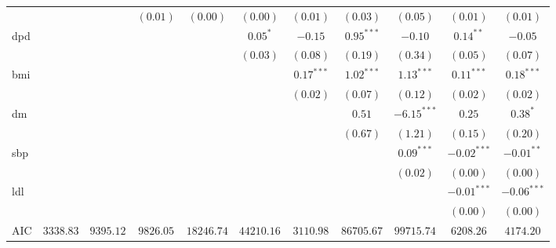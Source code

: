 \begin{tabular}{l c c c c c c c c c c}
                 &               &               & $(0.01)$      & $(0.00)$      & $(0.00)$      & $(0.01)$       & $(0.03)$      & $(0.05)$       & $(0.01)$       & $(0.01)$      \\
dpd              &               &               &               &               & $0.05^{*}$    & $-0.15$        & $0.95^{***}$  & $-0.10$        & $0.14^{**}$    & $-0.05$       \\
                 &               &               &               &               & $(0.03)$      & $(0.08)$       & $(0.19)$      & $(0.34)$       & $(0.05)$       & $(0.07)$      \\
bmi              &               &               &               &               &               & $0.17^{***}$   & $1.02^{***}$  & $1.13^{***}$   & $0.11^{***}$   & $0.18^{***}$  \\
                 &               &               &               &               &               & $(0.02)$       & $(0.07)$      & $(0.12)$       & $(0.02)$       & $(0.02)$      \\
dm               &               &               &               &               &               &                & $0.51$        & $-6.15^{***}$  & $0.25$         & $0.38^{*}$    \\
                 &               &               &               &               &               &                & $(0.67)$      & $(1.21)$       & $(0.15)$       & $(0.20)$      \\
sbp              &               &               &               &               &               &                &               & $0.09^{***}$   & $-0.02^{***}$  & $-0.01^{**}$  \\
                 &               &               &               &               &               &                &               & $(0.02)$       & $(0.00)$       & $(0.00)$      \\
ldl              &               &               &               &               &               &                &               &                & $-0.01^{***}$  & $-0.06^{***}$ \\
                 &               &               &               &               &               &                &               &                & $(0.00)$       & $(0.00)$      \\
\midrule
AIC              & $3338.83$     & $9395.12$     & $9826.05$     & $18246.74$    & $44210.16$    & $3110.98$      & $86705.67$    & $99715.74$     & $6208.26$      & $4174.20$     \\

\end{tabular}
